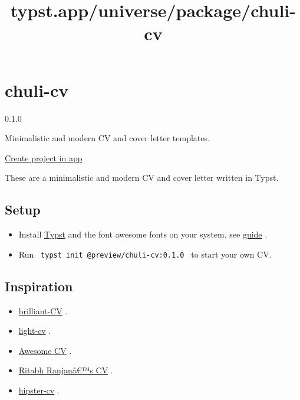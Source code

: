 \title{typst.app/universe/package/chuli-cv}

\label{banner}
\label{template-thumbnail}

\section{chuli-cv}\label{chuli-cv}

{ 0.1.0 }

Minimalistic and modern CV and cover letter templates.

\href{/app?template=chuli-cv&version=0.1.0}{Create project in app}

\label{readme}
These are a minimalistic and modern CV and cover letter written in
Typst.


\subsection{Setup}\label{setup}

\begin{itemize}
\tightlist
\item
  Install \href{https://typst.app/}{Typst} and the font awesome fonts on
  your system, see
  \href{https://github.com/duskmoon314/typst-fontawesome}{guide} .
\item
  Run \texttt{\ typst\ init\ @preview/chuli-cv:0.1.0\ } to start your
  own CV.
\end{itemize}

\subsection{Inspiration}\label{inspiration}

\begin{itemize}
\tightlist
\item
  \href{https://github.com/mintyfrankie/brilliant-CV}{brilliant-CV} .
\item
  \href{https://github.com/AnsgarLichter/light-cv}{light-cv} .
\item
  \href{https://github.com/posquit0/Awesome-CV}{Awesome CV} .
\item
  \href{https://www.overleaf.com/articles/ritabh-ranjans-cv/ngtndgryfykt}{Ritabh
  Ranjanâ€™s CV} .
\item
  \href{https://github.com/latex-ninja/hipster-cv}{hipster-cv} .
\end{itemize}

